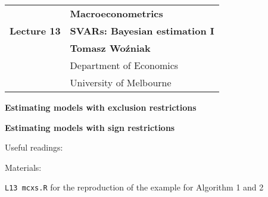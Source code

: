 \documentclass[notes,blackandwhite,mathsans,usenames,dvipsnames]{beamer}
\begin{document}







{
\begin{frame}

\vspace{1cm}
\begin{tabular}{rl}
&\textbf{\LARGE\color{purple} Macroeconometrics}\\[8ex]
\textbf{\Large Lecture 13}&\textbf{\Large\color{mcxs2}SVARs: Bayesian estimation I}\\[19ex]
&\textbf{Tomasz Wo\'zniak}\\[1ex]
&{\small\color{mcxs2} Department of Economics}\\
&{\small\color{mcxs2}University of Melbourne}
\end{tabular}

\end{frame}
}



{
\begin{frame}

\vspace{1cm}\textbf{\color{mcxs2}Estimating models with exclusion restrictions}

\bigskip\textbf{\color{purple}Estimating models with sign restrictions}

\vspace{1.5cm} Useful readings: \scriptsize



\normalsize
\bigskip Materials: \scriptsize

 \texttt{L13 mcxs.R} {\color{mcxs2}for the reproduction of the example for Algorithm 1 and 2}

\end{frame}
}
\end{document}
